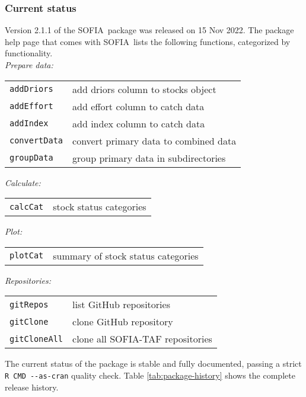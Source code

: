 \documentclass[12pt]{article}
\newcommand\SOFIA{{\sf SOFIA}}
\begin{document}
\subsubsection{Current status}

Version 2.1.1 of the \SOFIA\ package was released on 15 Nov 2022. The package
help page that comes with \SOFIA\ lists the following functions, categorized by
functionality.\\[-2ex]

{\it Prepare data:}

\begin{tabular}{ll}
  {\tt addDriors}   & add driors column to stocks object\\
  {\tt addEffort}   & add effort column to catch data\\
  {\tt addIndex}    & add index column to catch data\\
  {\tt convertData} & convert primary data to combined data\\
  {\tt groupData}   & group primary data in subdirectories\\[1.5ex]
\end{tabular}

\newpage

{\it Calculate:}

\begin{tabular}{ll}
  {\tt calcCat} & stock status categories\\[1.5ex]
\end{tabular}

{\it Plot:}

\begin{tabular}{ll}
  {\tt plotCat} & summary of stock status categories\\[1.5ex]
\end{tabular}

{\it Repositories:}

\begin{tabular}{ll}
  {\tt gitRepos}    & list GitHub repositories\\
  {\tt gitClone}    & clone GitHub repository\\
  {\tt gitCloneAll} & clone all SOFIA-TAF repositories\\[1.5ex]
\end{tabular}

The current status of the package is stable and fully documented, passing a
strict \verb|R CMD --as-cran| quality check. Table \ref{tab:package-history}
shows the complete release history.
\end{document}
